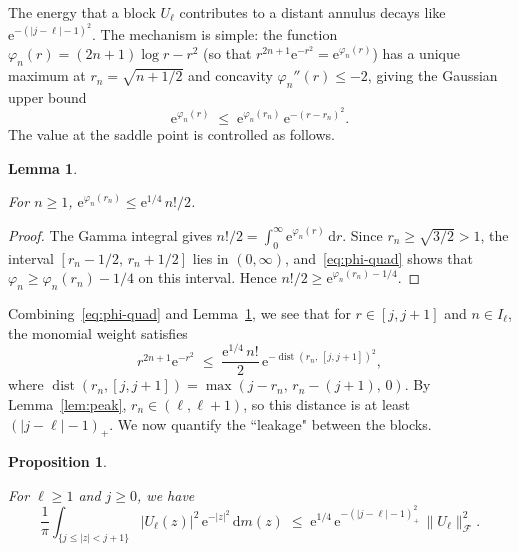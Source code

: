 \documentclass[11pt]{amsart}
\newtheorem{proposition}[theorem]{Proposition}
\newtheorem{lemma}[theorem]{Lemma}
\theoremstyle{remark}
\begin{document}
The energy that a block $U_\ell$ contributes to a distant annulus decays
like $\mathrm{e}^{-(\lvert j-\ell \rvert-1)^2}$.  The mechanism is simple: the function
$\varphi_n(r) = (2n{+}1)\log r - r^2$ (so that
$r^{2n+1}\mathrm{e}^{-r^2} = \mathrm{e}^{\varphi_n(r)}$) has a unique maximum at
$r_n = \sqrt{n+1/2}$ and concavity $\varphi_n''(r) \le -2$, giving the
Gaussian upper bound
\begin{equation}\label{eq:phi-quad}
\mathrm{e}^{\varphi_n(r)}
\;\le\;
\mathrm{e}^{\varphi_n(r_n)}\, \mathrm{e}^{-(r - r_n)^2}.
\end{equation}
The value at the saddle point is controlled as follows.

\begin{lemma}\label{lem:exp-phi}
\par\noindent
For $n \ge 1$,\;
$\mathrm{e}^{\varphi_n(r_n)} \le \mathrm{e}^{1/4}\, n!/2$.
\end{lemma}

\begin{proof}
The Gamma integral gives
$n!/2 = \int_0^\infty \mathrm{e}^{\varphi_n(r)}\,\mathrm{d} r$.
Since $r_n \ge \sqrt{3/2} > 1$, the interval $[r_n - 1/2,\, r_n + 1/2]$
lies in $(0,\infty)$, and~\eqref{eq:phi-quad} shows that
$\varphi_n \ge \varphi_n(r_n) - 1/4$ on this interval.  Hence
$n!/2 \ge \mathrm{e}^{\varphi_n(r_n) - 1/4}$.
\end{proof}

Combining~\eqref{eq:phi-quad} and Lemma~\ref{lem:exp-phi}, we see that for $r \in
[j, j{+}1]$ and $n \in I_\ell$, the monomial weight satisfies
\begin{equation}\label{eq:monomial-bound}
r^{2n+1}\mathrm{e}^{-r^2}
\;\le\;
\frac{\mathrm{e}^{1/4}\, n!}{2}\,
\mathrm{e}^{-\operatorname{dist}(r_n,\,[j,j{+}1])^2},
\end{equation}
where $\operatorname{dist}(r_n, [j,j{+}1]) = \max(j - r_n,\, r_n - (j{+}1),\, 0)$.
By Lemma~\ref{lem:peak}, $r_n \in (\ell, \ell{+}1)$, so this distance is at
least $(\lvert j - \ell \rvert - 1)_+$. We now quantify the ``leakage" between the blocks.

\begin{proposition}\label{prop:single-leak}

For $\ell \ge 1$ and $j \ge 0$, we have
\[
\frac{1}{\pi}\int_{\{j \le \lvert z \rvert < j+1\}}
\lvert U_\ell(z) \rvert^2\, \mathrm{e}^{-\lvert z \rvert^2}\,\mathrm{d} m(z)
\;\le\;
\mathrm{e}^{1/4}\,
\mathrm{e}^{-(\lvert j-\ell \rvert-1)_+^2}\,
\lVert U_\ell \rVert_\mathcal{F}^2.
\]
\end{proposition}
\end{document}
